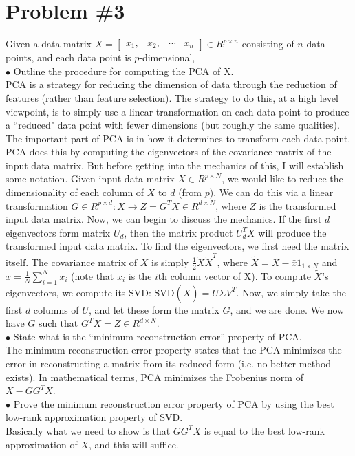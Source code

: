 \documentclass[12pt]{article}
\begin{document}
	\section*{Problem \#3}
	Given a data matrix $X = \left[
	\begin{array}{cccc}
	x_1, & x_2, & \cdots & x_n
	\end{array}
	\right] \in R^{p \times n}$ consisting of $n$ data points, and each data point is $p$-dimensional, \\
	$\bullet$ Outline the procedure for computing the PCA of X.\\
	PCA is a strategy for reducing the dimension of data through the reduction of features (rather than feature selection). The strategy to do this, at a high level viewpoint, is to simply use a linear transformation on each data point to produce a ``reduced" data point with fewer dimensions (but roughly the same qualities). The important part of PCA is in how it determines to transform each data point. PCA does this by computing the eigenvectors of the covariance matrix of the input data matrix. But before getting into the mechanics of this, I will establish some notation. Given input data matrix $X \in R^{p \times N}$, we would like to reduce the dimensionality of each column of $X$ to $d$ (from $p$). We can do this via a linear transformation $G \in R^{p \times d}: X \rightarrow Z = G^T X \in R^{d \times N}$, where $Z$ is the transformed input data matrix. Now, we can begin to discuss the mechanics. If the first $d$ eigenvectors form matrix $U_d$, then the matrix product $U_d^T X$ will produce the transformed input data matrix. To find the eigenvectors, we first need the matrix itself. The covariance matrix of $X$ is simply $\frac{1}{2}\tilde{X}\tilde{X}^T$, where $\tilde{X}=X-\bar{x}1_{1\times N}$ and $\bar{x} = \frac{1}{N}\sum_{i=1}^{N} x_i$ (note that $x_i$ is the $i$th column vector of X). To compute $\tilde{X}$'s eigenvectors, we compute its SVD: $\text{SVD}(\tilde{X}) = U\Sigma V^T$. Now, we simply take the first $d$ columns of $U$, and let these form the matrix $G$, and we are done. We now have $G$ such that $G^T X = Z \in R^{d \times N}$.
	\\
	$\bullet$ State what is the “minimum reconstruction error” property of PCA. \\
	The minimum reconstruction error property states that the PCA minimizes the error in reconstructing a matrix from its reduced form (i.e. no better method exists). In mathematical terms, PCA minimizes the Frobenius norm of $X - GG^T X$.
	\\
	$\bullet$ Prove the minimum reconstruction error property of PCA by using the best low-rank
	approximation property of SVD. \\
	Basically what we need to show is that $GG^T X$ is equal to the best low-rank approximation of $X$, and this will suffice.
	
\end{document}
